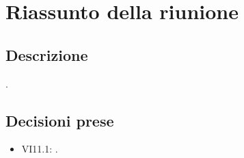 \section{Riassunto della riunione}
\subsection{Descrizione}

.

\subsection{Decisioni prese}
\begin{itemize}
\item VI11.1: .
\end{itemize}
